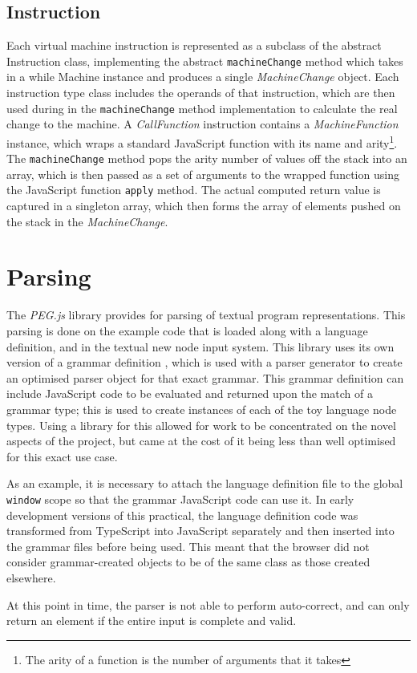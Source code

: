 \subsection{Instruction}

Each virtual machine instruction is represented as a subclass of the abstract Instruction class, implementing the abstract \verb+machineChange+ method which takes in a while Machine instance and produces a single \textit{MachineChange} object. Each instruction type class includes the operands of that instruction, which are then used during in the \verb+machineChange+ method implementation to calculate the real change to the machine. A \textit{CallFunction} instruction contains a \textit{MachineFunction} instance, which wraps a standard JavaScript function with its name and arity\footnote{The arity of a function is the number of arguments that it takes}. The \verb+machineChange+ method pops the arity number of values off the stack into an array, which is then passed as a set of arguments to the wrapped function using the JavaScript function \verb+apply+ method. The actual computed return value is captured in a singleton array, which then forms the array of elements pushed on the stack in the \textit{MachineChange}.

\section{Parsing}

The \textit{PEG.js} library provides for parsing of textual program representations. This parsing is done on the example code that is loaded along with a language definition, and in the textual new node input system. This library uses its own version of a grammar definition \cite{pegjs}, which is used with a parser generator to create an optimised parser object for that exact grammar. This grammar definition can include JavaScript code to be evaluated and returned upon the match of a grammar type; this is used to create instances of each of the toy language node types. Using a library for this allowed for work to be concentrated on the novel aspects of the project, but came at the cost of it being less than well optimised for this exact use case.

As an example, it is necessary to attach the language definition file to the global \verb+window+ scope so that the grammar JavaScript code can use it. In early development versions of this practical, the language definition code was transformed from TypeScript into JavaScript separately and then inserted into the grammar files before being used. This meant that the browser did not consider grammar-created objects to be of the same class as those created elsewhere.

At this point in time, the parser is not able to perform auto-correct, and can only return an element if the entire input is complete and valid.